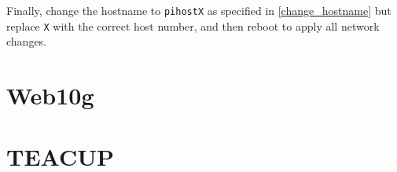 Finally, change the hostname to \lstinline{pihostX} as specified in \ref{change_hostname} but replace \lstinline{X} with the correct host number, and then reboot to apply all network changes.


\section{Web10g}



\section{TEACUP}

